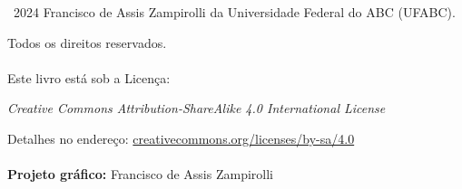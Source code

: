 %
%     

\textcopyright\ 2024 Francisco de Assis Zampirolli da Universidade Federal do ABC (UFABC). 

Todos os direitos reservados. \\ \\

Este livro está sob a Licença: 

\hspace{1cm}\textit{Creative Commons
Attribution-ShareAlike 4.0 International License}

\hspace{1cm}Detalhes no endereço: \href{https://creativecommons.org/licenses/by-sa/4.0}{creativecommons.org/licenses/by-sa/4.0}\\ \\


\textbf{Projeto gráfico:} Francisco de Assis Zampirolli \\

